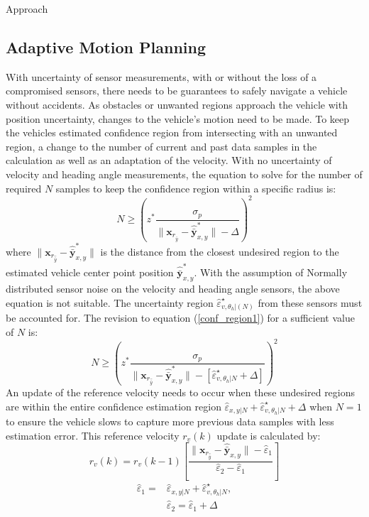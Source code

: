 \begin{section}{Approach}
\subsection{Adaptive Motion Planning}
With uncertainty of sensor measurements, with or without the loss of a compromised sensors, there needs to be guarantees to safely navigate a vehicle without accidents. As obstacles or unwanted regions approach the vehicle  with position uncertainty, changes to the vehicle's motion need to be made. To keep the vehicles estimated confidence region from intersecting with an unwanted region, a change to the number of current and past data samples in the calculation as well as an adaptation of the velocity. With no uncertainty of velocity and heading angle measurements, the equation to solve for the number of required $N$ samples to keep the confidence region within a specific radius is:
    \begin{equation}
    \label{conf_region1}
	    N \geq \left(z^{*} \frac{ \sigma_p }{ {\lVert \bm{x}_{r_{\hat{\bar{y}}}} - \hat{\bar{\bm{y}}}_{x,y}^* \rVert} -\Delta } \right)^2
	\end{equation}
where $\lVert {\bm{x}_{r_{\hat{\bar{y}}}}-\hat{\bar{\bm{y}}}_{x,y}^*} \rVert$ is the distance from the closest undesired region to the estimated vehicle center point position $\hat{\bar{\bm{y}}}_{x,y}^*$.
With the assumption of Normally distributed sensor noise on the velocity and heading angle sensors, the above equation is not suitable. The uncertainty region $\hat{\varepsilon}_{v,\theta_h|(N)}^{\star}$ from these sensors must be accounted for. The revision to equation (\ref{conf_region1}) for a sufficient value of $N$ is:
    \begin{equation}
	    N \geq \left(z^{*} \frac{ \sigma_p }{ {\lVert \bm{x}_{r_{\hat{\bar{y}}}} - \hat{\bar{\bm{y}}}_{x,y}^* \rVert} -[\hat{\varepsilon}_{v,\theta_h|N}^{\star}+\Delta] } \right)^2
	\end{equation}
An update of the reference velocity needs to occur when these undesired regions are within the entire confidence estimation region $ \hat{\varepsilon}_{x,y|N} +\hat{\varepsilon}_{v,\theta_h|N}^{\star}+\Delta$ when $N=1$ to ensure the vehicle slows to capture more previous data samples with less estimation error. This reference velocity $r_v(k)$ update is calculated by:
    \begin{equation}
	    r_v(k)=r_v(k-1) \left[ \frac{\lVert \bm{x}_{r_{\hat{\bar{y}}}} - \hat{\bar{\bm{y}}}_{x,y} \rVert - \hat{\varepsilon}_1}{\hat{\varepsilon}_2 - \hat{\varepsilon}_1} \right]
	\end{equation}
	\begin{equation}
	\begin{split}
	    \hat{\varepsilon}_1=&\hat{\varepsilon}_{x,y|N} +\hat{\varepsilon}_{v,\theta_h|N}^{\star},\\ &\hat{\varepsilon}_2=\hat{\varepsilon}_1+\Delta \nonumber	    
	\end{split}
	\end{equation}
	

\end{section}
